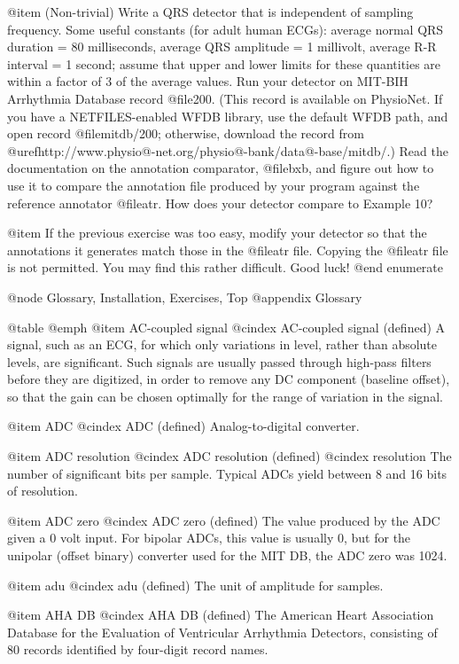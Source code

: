 {{{{{{{{{@item
(Non-trivial) Write a QRS detector that is independent of sampling frequency.
Some useful constants (for adult human ECGs): average normal QRS duration = 80
milliseconds, average QRS amplitude = 1 millivolt, average R-R interval = 1
second; assume that upper and lower limits for these quantities are within a
factor of 3 of the average values.  Run your detector on MIT-BIH Arrhythmia
Database record @file{200}.  (This record is available on PhysioNet.  If you
have a NETFILES-enabled WFDB library, use the default WFDB path, and open
record @file{mitdb/200}; otherwise, download the record from
@uref{http://www.physio@-net.org/physio@-bank/data@-base/mitdb/}.)  Read the
documentation on the annotation comparator, @file{bxb}, and figure out how to
use it to compare the annotation file produced by your program against the
reference annotator @file{atr}.  How does your detector compare to Example
10?

@item
If the previous exercise was too easy, modify your detector so that the
annotations it generates match those in the @file{atr} file.  Copying
the @file{atr} file is not permitted.  You may find this rather
difficult.  Good luck!
@end enumerate

@node     Glossary, Installation, Exercises, Top
@appendix Glossary

@table @emph
@item AC-coupled signal
@cindex AC-coupled signal (defined)
A signal, such as an ECG, for which only variations in level, rather
than absolute levels, are significant.  Such signals are usually passed
through high-pass filters before they are digitized, in order to remove
any DC component (baseline offset), so that the gain can be chosen
optimally for the range of variation in the signal.

@item ADC
@cindex ADC (defined)
Analog-to-digital converter.

@item ADC resolution
@cindex ADC resolution (defined)
@cindex resolution
The number of significant bits per sample.  Typical ADCs yield between 8
and 16 bits of resolution.

@item ADC zero
@cindex ADC zero (defined)
The value produced by the ADC given a 0 volt input.  For bipolar ADCs,
this value is usually 0, but for the unipolar (offset binary) converter
used for the MIT DB, the ADC zero was 1024.

@item adu
@cindex adu (defined)
The unit of amplitude for samples.

@item AHA DB
@cindex AHA DB (defined)
The American Heart Association Database for the Evaluation of Ventricular
Arrhythmia Detectors, consisting of 80 records identified by four-digit
record names.

}}}}}}}}}
